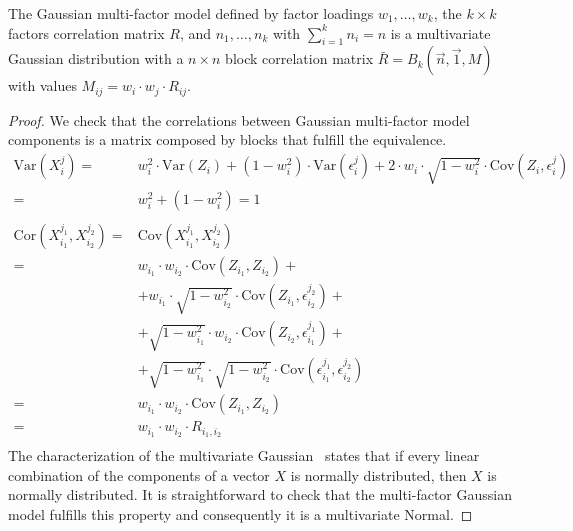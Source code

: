 \documentclass[11pt,fleqn]{book} %
\begin{document}
\begin{proposition}
	\label{prop:gmfigs}
	The Gaussian multi-factor model defined by factor loadings 
	$w_1,\dots,w_k$, the $k {\times} k$ factors correlation matrix $R$, and
	$n_1,\dots,n_k$ with $\sum_{i=1}^k n_i = n$ is a multivariate Gaussian 
	distribution with a $n {\times} n$ block correlation matrix 
	$\bar{R}=B_k(\vec{n},\vec{1},M)$ with values
	$M_{ij} = w_i \cdot w_j \cdot R_{ij}$.
\end{proposition}
\begin{proof}
	We check that the correlations between Gaussian multi-factor model
	components is a matrix composed by blocks that fulfill the equivalence.
	\begin{displaymath}
		\begin{array}{rl}
			\text{Var}(X_i^j) =                       &
			w_i^2 \cdot \text{Var}(Z_i) + (1-w_i^2) \cdot \text{Var}(\epsilon_i^j) +
			2 \cdot w_i \cdot \sqrt{1-w_i^2} \cdot \text{Cov}(Z_i, \epsilon_i^j)    \\
			=                                         & w_i^2 + (1-w_i^2) = 1       \\
			                                          &                             \\
			\text{Cor}(X_{i_1}^{j_1},X_{i_2}^{j_2}) = & \text{Cov}(X_{i_1}^{j_1},X_{i_2}^{j_2})                                                                    \\
			=                                         & w_{i_1} \cdot w_{i_2} \cdot \text{Cov}(Z_{i_1},Z_{i_2}) +                                                  \\
			                                          & + w_{i_1} \cdot \sqrt{1-w_{i_2}^2} \cdot \text{Cov}(Z_{i_1}, \epsilon_{i_2}^{j_2}) +                       \\
			                                          & + \sqrt{1-w_{i_1}^2} \cdot w_{i_2} \cdot \text{Cov}(Z_{i_2}, \epsilon_{i_1}^{j_1}) +                       \\
			                                          & + \sqrt{1-w_{i_1}^2} \cdot \sqrt{1-w_{i_2}^2} \cdot \text{Cov}(\epsilon_{i_1}^{j_1}, \epsilon_{i_2}^{j_2}) \\
			=                                         & w_{i_1} \cdot w_{i_2} \cdot \text{Cov}(Z_{i_1}, Z_{i_2})                                                   \\
			=                                         & w_{i_1} \cdot w_{i_2} \cdot R_{i_1,i_2}                                                                    \\
		\end{array}
	\end{displaymath}
	The characterization of the multivariate Gaussian~\cite[thm. 2.6.2]{anderson:1984}
	states that if every linear combination of the components of a 
	vector $X$ is normally distributed, then $X$ is normally distributed.
	It is straightforward to check that the multi-factor Gaussian model 
	fulfills this property and consequently it is a multivariate Normal.
\end{proof}
\end{document}
